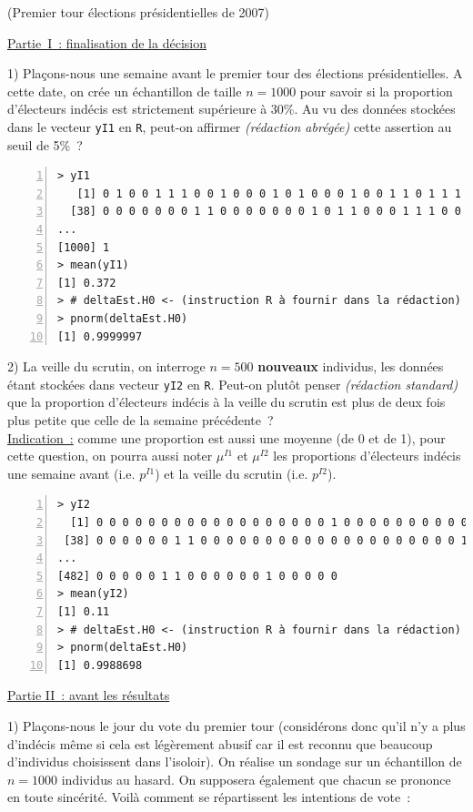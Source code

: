 \documentclass[10pt]{report}
\newcommand{\redabr}{\textit{(rédaction abrégée) }}
\newcommand{\redstd}{\textit{(rédaction standard) }}
\begin{document}
\begin{exercice} (Premier tour élections présidentielles de 2007)
${ }$

\noindent \underline{Partie~I~: finalisation de la décision}

1)  
Plaçons-nous une semaine avant le premier tour des élections présidentielles. A cette date, on crée un échantillon de taille $n=1000$ pour savoir si la proportion d'électeurs indécis est strictement supérieure à 30\%. Au vu des données stockées dans le vecteur \texttt{yI1} en \texttt{R}, peut-on affirmer \redabr cette assertion au seuil de 5\%~? 

\IndicR
\begin{Verbatim}[frame=leftline,fontfamily=tt,fontshape=n,numbers=left]
> yI1
   [1] 0 1 0 0 1 1 1 0 0 1 0 0 0 1 0 1 0 0 0 1 0 0 1 1 0 1 1 1 0 0 1 1 0 1 1 0 1
  [38] 0 0 0 0 0 0 0 1 1 0 0 0 0 0 0 0 1 0 1 1 0 0 0 1 1 1 0 0 0 0 1 1 0 1 1 1 0
...
[1000] 1
> mean(yI1)
[1] 0.372
> # deltaEst.H0 <- (instruction R à fournir dans la rédaction)
> pnorm(deltaEst.H0)
[1] 0.9999997
\end{Verbatim}





2) 
La veille du scrutin, on interroge $n=500$ {\bf nouveaux} individus, les données étant stockées dans vecteur \texttt{yI2} en \texttt{R}. Peut-on plutôt penser \redstd que la proportion d'électeurs indécis à la veille du scrutin est plus de deux fois plus petite que celle de la semaine précédente~?  \\
\underline{Indication~:} comme une proportion est aussi une moyenne (de 0 et de 1), pour cette question, on pourra aussi noter $\mu^{I1}$ et $\mu^{I2}$ les proportions d'électeurs indécis une semaine avant (i.e. $p^{I1}$) et la veille du scrutin (i.e. $p^{I2}$).


\IndicR
\begin{Verbatim}[frame=leftline,fontfamily=tt,fontshape=n,numbers=left]
> yI2
  [1] 0 0 0 0 0 0 0 0 0 0 0 0 0 0 0 0 0 0 1 0 0 0 0 0 0 0 0 0 0 0 0 0 0 0 1 0 0
 [38] 0 0 0 0 0 0 1 1 0 0 0 0 0 0 0 0 0 0 0 0 0 0 0 0 0 0 0 0 1 0 0 0 0 0 1 0 0
...
[482] 0 0 0 0 0 1 1 0 0 0 0 0 0 1 0 0 0 0 0
> mean(yI2)
[1] 0.11
> # deltaEst.H0 <- (instruction R à fournir dans la rédaction)
> pnorm(deltaEst.H0)
[1] 0.9988698
\end{Verbatim}




\noindent \underline{Partie II~: avant les résultats}

1) 
Plaçons-nous le jour du vote du premier tour (considérons donc qu'il n'y a plus d'indécis même si cela est légèrement abusif car il est reconnu que beaucoup d'individus choisissent dans l'isoloir). On réalise un sondage sur un échantillon de $n=1000$ individus au hasard. On supposera également que chacun se prononce en toute sincérité. Voilà comment se répartissent les intentions de vote~:


\end{exercice}
\end{document}
